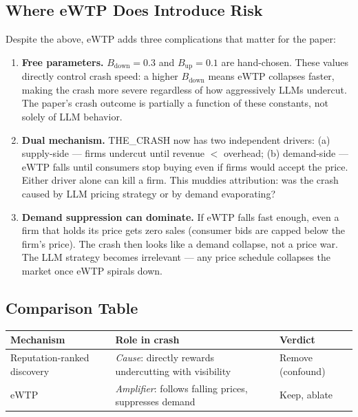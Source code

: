 \documentclass{article}
\begin{document}
\subsection{Where eWTP Does Introduce Risk}

Despite the above, eWTP adds three complications that matter for the paper:

\begin{enumerate}
  \item \textbf{Free parameters.} $B_{\text{down}} = 0.3$ and $B_{\text{up}} = 0.1$ are hand-chosen. These values directly control crash speed: a higher $B_{\text{down}}$ means eWTP collapses faster, making the crash more severe regardless of how aggressively LLMs undercut. The paper's crash outcome is partially a function of these constants, not solely of LLM behavior.

  \item \textbf{Dual mechanism.} THE\_CRASH now has two independent drivers: (a) supply-side — firms undercut until revenue $<$ overhead; (b) demand-side — eWTP falls until consumers stop buying even if firms would accept the price. Either driver alone can kill a firm. This muddies attribution: was the crash caused by LLM pricing strategy or by demand evaporating?

  \item \textbf{Demand suppression can dominate.} If eWTP falls fast enough, even a firm that holds its price gets zero sales (consumer bids are capped below the firm's price). The crash then looks like a demand collapse, not a price war. The LLM strategy becomes irrelevant — any price schedule collapses the market once eWTP spirals down.
\end{enumerate}

\subsection{Comparison Table}

\begin{center}
\begin{tabular}{lll}
\toprule
Mechanism & Role in crash & Verdict \\
\midrule
Reputation-ranked discovery & \emph{Cause}: directly rewards undercutting with visibility & Remove (confound) \\
eWTP & \emph{Amplifier}: follows falling prices, suppresses demand & Keep, ablate \\
\bottomrule
\end{tabular}
\end{center}
\end{document}
